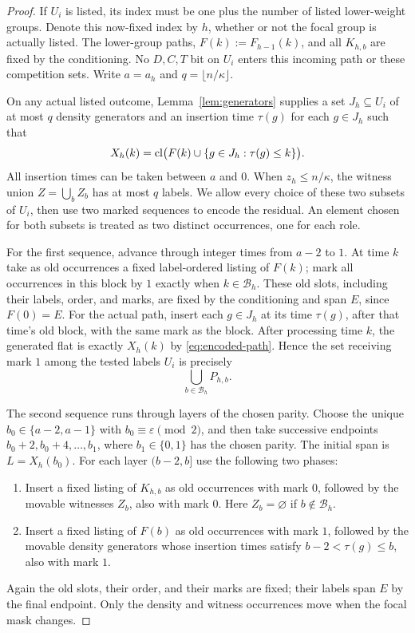 \begin{proof}
If $U_i$ is listed, its index must be one plus the number of listed
lower-weight groups.  Denote this now-fixed index by $h$, whether or
not the focal group is actually listed.  The lower-group paths,
$F(k):=F_{h-1}(k)$, and all $K_{h,b}$ are fixed by the conditioning.
No $D,C,T$ bit on $U_i$ enters this incoming path or these competition
sets.  Write $a=a_h$ and $q=\lfloor n/\kappa\rfloor$.

On any actual listed outcome, Lemma~\ref{lem:generators} supplies a set
$J_h\subseteq U_i$ of at most $q$ density generators and an insertion
time $\tau(g)$ for each $g\in J_h$ such that
\begin{equation}\label{eq:encoded-path}
 X_h(k)=\operatorname{cl}\bigl(F(k)\cup\{g\in J_h:\tau(g)\le k\}\bigr).
\end{equation}
All insertion times can be taken between $a$ and $0$.
When $z_h\le n/\kappa$, the witness union $Z=\bigcup_b Z_b$ has at
most $q$ labels.  We allow every choice of these two subsets of $U_i$,
then use two marked sequences to encode the residual.  An element
chosen for both subsets is treated as two distinct occurrences, one
for each role.

For the first sequence, advance through integer times from $a-2$ to
$1$.  At time $k$ take as old occurrences a fixed label-ordered listing
of $F(k)$; mark all occurrences in this block by $1$ exactly when
$k\in\mathcal B_h$.  These old slots, including their labels, order,
and marks, are fixed by the conditioning and span $E$, since
$F(0)=E$.  For the actual path, insert each $g\in J_h$ at its time
$\tau(g)$, after that time's old block, with the same mark as the
block.  After processing time $k$, the generated flat is exactly $X_h(k)$
by \eqref{eq:encoded-path}.  Hence the set receiving mark $1$ among the
tested labels $U_i$ is precisely
\begin{equation}\label{eq:first-pivot-test}
 \bigcup_{b\in\mathcal B_h} P_{h,b}.
\end{equation}

The second sequence runs through layers of the chosen parity.  Choose
the unique $b_0\in\{a-2,a-1\}$ with
$b_0\equiv\varepsilon\pmod2$, and then take
successive endpoints $b_0+2,b_0+4,\ldots,b_1$, where
$b_1\in\{0,1\}$ has the chosen parity.  The initial span is
$L=X_h(b_0)$.  For each layer $(b-2,b]$ use the following two phases:
\begin{enumerate}[label=\textnormal{(\roman*)},leftmargin=*]
 \item Insert a fixed listing of $K_{h,b}$ as old occurrences with
 mark $0$, followed by the movable witnesses $Z_b$, also with mark $0$.
 Here $Z_b=\varnothing$ if $b\notin\mathcal B_h$.
 \item Insert a fixed listing of $F(b)$ as old occurrences with
 mark $1$, followed by the movable density generators whose insertion
 times satisfy $b-2<\tau(g)\le b$, also with mark $1$.
\end{enumerate}
Again the old slots, their order, and their marks are fixed; their
labels span $E$ by the final endpoint.  Only the density and witness
occurrences move when the focal mask changes.


\end{proof}
